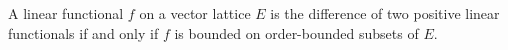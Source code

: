 A linear functional $f$ on a vector lattice $E$ is the difference of two positive linear functionals if and only if $f$ is bounded on order-bounded subsets of $E$.
